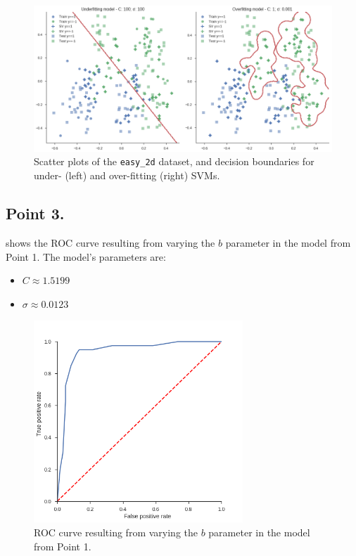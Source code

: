 \documentclass[a4paper,11pt]{article}
\begin{document}
\begin{figure}
    \centering
    \includegraphics[width=\textwidth]{images/assignment4_2.png}
    \caption{Scatter plots of the \texttt{easy\_2d} dataset, and decision boundaries for under- (left) and over-fitting (right) SVMs.}
    \label{fig:assignment4_2}
\end{figure}

\subsection*{Point 3.}

 shows the ROC curve resulting from varying the $b$ parameter in the model from Point 1.
The model's parameters are:
\begin{itemize}
    \item $C \approx 1.5199$
    \item $\sigma \approx 0.0123$
\end{itemize}

\begin{figure}
    \centering
    \includegraphics[width=0.7\textwidth]{images/assignment4_3.png}
    \caption{ROC curve resulting from varying the $b$ parameter in the model from Point 1.}
    \label{fig:assignment4_3}
\end{figure}
\end{document}
